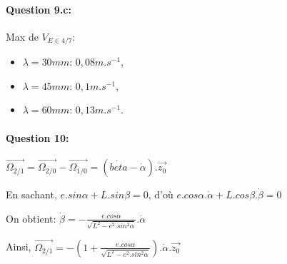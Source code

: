 \paragraph{Question 9.c:}

Max de $V_{E\in4/7}$:
\begin{itemize}
 \item $\lambda=30mm$: $0,08m.s^{-1}$,
 \item $\lambda=45mm$: $0,1m.s^{-1}$,
 \item $\lambda=60mm$: $0,13m.s^{-1}$.
\end{itemize}
\paragraph{Question 10:}

$\overrightarrow{\Omega_{2/1}}=\overrightarrow{\Omega_{2/0}}-\overrightarrow{\Omega_{1/0}}=(\dot{beta}-\dot{\alpha}).\overrightarrow{z_0}$

En sachant, $e.sin\alpha+L.sin\beta=0$, d'où $e.cos\alpha.\dot{\alpha}+L.cos\beta.\dot{\beta}=0$

On obtient: $\dot{\beta}=-\frac{e.cos\alpha}{\sqrt{L^2-e^2.sin^2\alpha}}.\dot{\alpha}$

Ainsi, $\overrightarrow{\Omega_{2/1}}=-\left(1+\frac{e.cos\alpha}{\sqrt{L^2-e^2.sin^2\alpha}}\right).\dot{\alpha}.\overrightarrow{z_0}$


